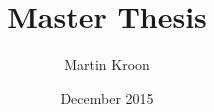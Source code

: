 \documentclass[10pt,oneside]{book}
\title{Master Thesis}
\author{Martin Kroon}
\date{December 2015}
\begin{document}
\let\oldequation=\equation
\let\endoldequation=\endequation
\renewenvironment{equation}{\vspace{.125in}\begin{oldequation}}{\end{oldequation}\vspace{.125in}}

\frontmatter





\restoregeometry
\tableofcontents

\mainmatter








\printbibliography[heading=bibintoc]


% 
\end{document}
